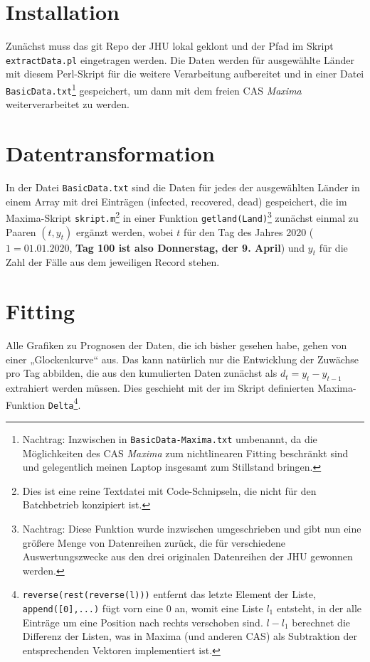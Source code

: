 \documentclass[a4paper,11pt]{article}
\begin{document}
\section{Installation} 

Zunächst muss das git Repo der JHU lokal geklont und der Pfad im Skript
\texttt{extractData.pl} eingetragen werden.  Die Daten werden für ausgewählte
Länder mit diesem Perl-Skript für die weitere Verarbeitung aufbereitet und in
einer Datei \texttt{BasicData.txt}\footnote{Nachtrag: Inzwischen in
  \texttt{BasicData-Maxima.txt} umbenannt, da die Möglichkeiten des CAS
  \emph{Maxima} zum nichtlinearen Fitting beschränkt sind und gelegentlich
  meinen Laptop insgesamt zum Stillstand bringen.} gespeichert, um dann mit
dem freien CAS \emph{Maxima} weiterverarbeitet zu werden.

\section{Datentransformation}

In der Datei \texttt{BasicData.txt} sind die Daten für jedes der ausgewählten
Länder in einem Array mit drei Einträgen (infected, recovered, dead)
gespeichert, die im Maxima-Skript \texttt{skript.m}\footnote{Dies ist eine
  reine Textdatei mit Code-Schnipseln, die nicht für den Batchbetrieb
  konzipiert ist.} in einer Funktion \texttt{getland(Land)}\footnote{Nachtrag:
  Diese Funktion wurde inzwischen umgeschrieben und gibt nun eine größere
  Menge von Datenreihen zurück, die für verschiedene Auswertungszwecke aus den
  drei originalen Datenreihen der JHU gewonnen werden.} zunächst einmal zu
Paaren $(t,y_t)$ ergänzt werden, wobei $t$ für den Tag des Jahres 2020
($1=01.01.2020$, \textbf{Tag 100 ist also Donnerstag, der 9. April}) und $y_t$
für die Zahl der Fälle aus dem jeweiligen Record stehen.

\section{Fitting}

Alle Grafiken zu Prognosen der Daten, die ich bisher gesehen habe, gehen von
einer „Glockenkurve“ aus.  Das kann natürlich nur die Entwicklung der Zuwächse
pro Tag abbilden, die aus den kumulierten Daten zunächst als $d_t=y_t-y_{t-1}$
extrahiert werden müssen. Dies geschieht mit der im Skript definierten
Maxima-Funktion \texttt{Delta}\footnote{\texttt{reverse(rest(reverse(l)))}
  entfernt das letzte Element der Liste, \texttt{append([0],...)} fügt vorn
  eine $0$ an, womit eine Liste $l_1$ entsteht, in der alle Einträge um eine
  Position nach rechts verschoben sind. $l-l_1$ berechnet die Differenz der
  Listen, was in Maxima (und anderen CAS) als Subtraktion der entsprechenden
  Vektoren implementiert ist.}.
\end{document}
